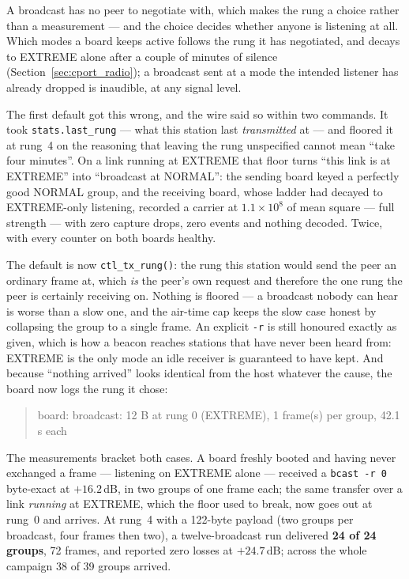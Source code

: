 A broadcast has no peer to negotiate with, which makes the rung a
choice rather than a measurement --- and the choice decides whether
anyone is listening at all. Which modes a board keeps active follows
the rung it has negotiated, and decays to EXTREME alone after a couple
of minutes of silence (Section~\ref{sec:cport_radio}); a broadcast sent
at a mode the intended listener has already dropped is inaudible, at
any signal level.

The first default got this wrong, and the wire said so within two
commands. It took \texttt{stats.last\_rung} --- what this station last
\emph{transmitted} at --- and floored it at rung~4 on the reasoning
that leaving the rung unspecified cannot mean ``take four minutes''.
On a link running at EXTREME that floor turns ``this link is at
EXTREME'' into ``broadcast at NORMAL'': the sending board keyed a
perfectly good NORMAL group, and the receiving board, whose ladder had
decayed to EXTREME-only listening, recorded a carrier at
$1.1\times10^{8}$ of mean square --- full strength --- with zero
capture drops, zero events and nothing decoded. Twice, with every
counter on both boards healthy.

The default is now \texttt{ctl\_tx\_rung()}: the rung this station
would send the peer an ordinary frame at, which \emph{is} the peer's
own request and therefore the one rung the peer is certainly receiving
on. Nothing is floored --- a broadcast nobody can hear is worse than a
slow one, and the air-time cap keeps the slow case honest by collapsing
the group to a single frame. An explicit \texttt{-r} is still honoured
exactly as given, which is how a beacon reaches stations that have
never been heard from: EXTREME is the only mode an idle receiver is
guaranteed to have kept. And because ``nothing arrived'' looks
identical from the host whatever the cause, the board now logs the rung
it chose:

\begin{quote}\ttfamily\small
board: broadcast: 12 B at rung 0 (EXTREME), 1 frame(s) per group,
42.1 s each
\end{quote}

The measurements bracket both cases. A board freshly booted and having
never exchanged a frame --- listening on EXTREME alone --- received a
\texttt{bcast -r 0} byte-exact at $+16.2$\,dB, in two groups of one
frame each; the same transfer over a link \emph{running} at EXTREME,
which the floor used to break, now goes out at rung~0 and arrives. At
rung~4 with a 122-byte payload (two groups per broadcast, four frames
then two), a twelve-broadcast run delivered \textbf{24 of 24 groups},
72 frames, and reported zero losses at $+24.7$\,dB; across the whole
campaign 38 of 39 groups arrived.

